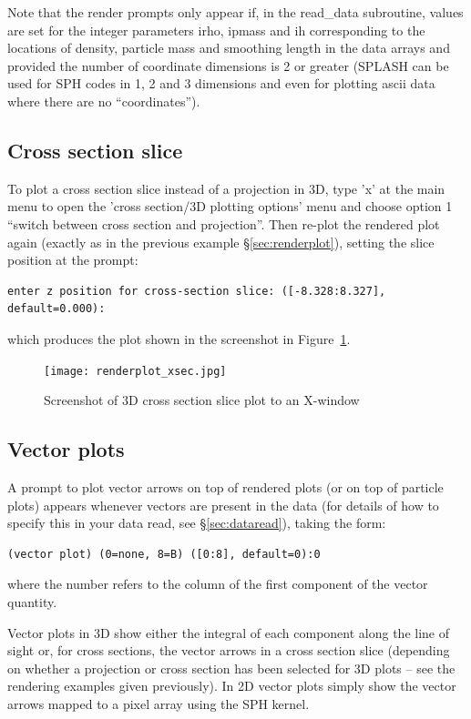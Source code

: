 \documentclass[a4paper,11pt]{article}
\begin{document}
 Note that the render prompts only appear if, in the read\_data subroutine, values are set for the integer parameters irho, ipmass and ih corresponding to the locations of density, particle mass and smoothing length in the data arrays and provided the number of coordinate dimensions is 2 or greater (SPLASH can be used for SPH codes in 1, 2 and 3 dimensions and even for plotting ascii data where there are no ``coordinates'').

\subsection{Cross section slice}
To plot a cross section slice instead of a projection in 3D, type 'x' at the main menu to open the 'cross section/3D plotting options' menu and choose option 1 ``switch between cross section and projection''. Then re-plot the rendered plot again (exactly as in the previous example \S\ref{sec:renderplot}), setting the slice position at the prompt:
\begin{verbatim}
enter z position for cross-section slice: ([-8.328:8.327], default=0.000):
\end{verbatim}
which produces the plot shown in the screenshot in Figure~\ref{fig:renderplot_xsec}.
\begin{figure}[h]
\begin{center}
\texttt{[image: renderplot\_xsec.jpg]}
\caption{Screenshot of 3D cross section slice plot to an X-window}
\label{fig:renderplot_xsec}
\end{center}
\end{figure}

\subsection{Vector plots}
 A prompt to plot vector arrows on top of rendered plots (or on top of particle plots) appears whenever vectors are present in the data (for details of how to specify this in your data read, see \S\ref{sec:dataread}), taking the form:
\begin{verbatim}
(vector plot) (0=none, 8=B) ([0:8], default=0):0
\end{verbatim}
where the number refers to the column of the first component of the vector quantity. 

Vector plots in 3D show either the integral of each component along the line of sight or, for cross sections, the vector arrows in a cross section slice (depending on whether a projection or cross section has been selected for 3D plots -- see the rendering examples given previously). In 2D vector plots simply show the vector arrows mapped to a pixel array using the SPH kernel.
\end{document}
